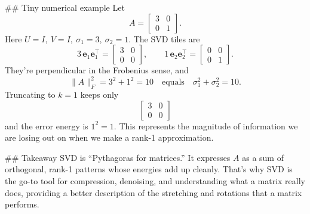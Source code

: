 ##  Tiny numerical example
Let
$$
A=\begin{bmatrix}3&0\\[2pt]0&1\end{bmatrix}.
$$
Here $U=I,\ V=I,\ \sigma_1=3,\ \sigma_2=1$. The SVD tiles are
$$
3\,\mathbf{e}_1\mathbf{e}_1^\top=
\begin{bmatrix}3&0\\0&0\end{bmatrix},
\qquad
1\,\mathbf{e}_2\mathbf{e}_2^\top=
\begin{bmatrix}0&0\\0&1\end{bmatrix}.
$$
They’re perpendicular in the Frobenius sense, and
$$
\|A\|_F^2 = 3^2+1^2 = 10
\quad\text{equals}\quad
\sigma_1^2+\sigma_2^2=10.
$$
Truncating to \(k=1\) keeps only $$\begin{bmatrix}3&0\\0&0
\end{bmatrix}$$ and the error energy is $1^2=1$. This represents the magnitude of information we are losing out on when we make a rank-1 approximation.


## Takeaway
SVD is “Pythagoras for matrices.” It expresses $A$ as a sum of orthogonal, rank-1 patterns whose energies add up cleanly. That’s why SVD is the go-to tool for compression, denoising, and understanding what a matrix really does, providing a better description of the stretching and rotations that a matrix performs.
